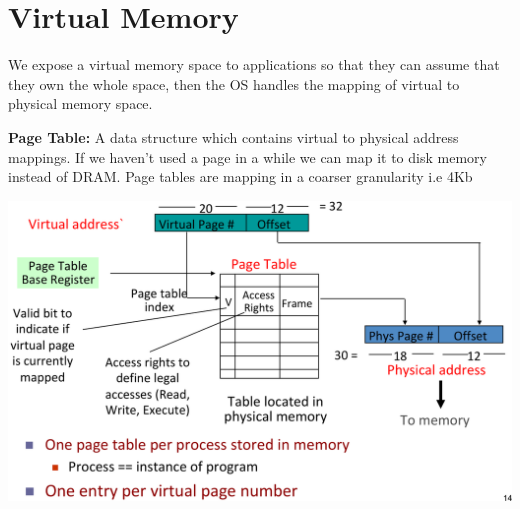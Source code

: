 \section{Virtual Memory}
We expose a virtual memory space to applications so that they can
assume that they own the whole space, then the OS handles the mapping of virtual
to physical memory space.

\textbf{Page Table:} A data structure which contains virtual to physical address
mappings. If we haven't used a page in a while we can map it to disk memory instead
of DRAM. Page tables are mapping in a coarser granularity i.e 4Kb

\includegraphics[width=\linewidth]{png/pagetable.png}
